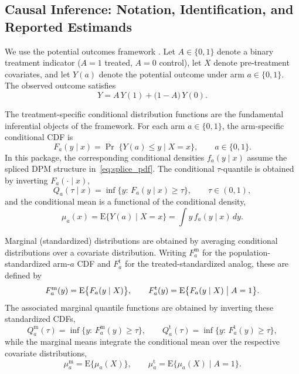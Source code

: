 \documentclass[article]{jss}\usepackage[]{graphicx}\usepackage[]{xcolor}
\begin{document}
\subsection{Causal Inference: Notation, Identification, and Reported Estimands}
\label{subsec:causal}

We use the potential outcomes framework
\citep{Neyman1923,Rubin1974,ImbensRubin2015}. Let $A\in\{0,1\}$ denote a
binary treatment indicator ($A=1$ treated, $A=0$ control), let $X$ denote
pre-treatment covariates, and let $Y(a)$ denote the potential outcome under arm
$a\in\{0,1\}$. The observed outcome satisfies
\begin{equation}
Y = A\,Y(1) + \bigl(1-A\bigr)\,Y(0).
\label{eq:po_observed}
\end{equation}

The treatment-specific conditional distribution functions are the
fundamental inferential objects of the framework. For each arm
$a\in\{0,1\}$, the arm-specific conditional CDF is
\begin{equation}
F_a(y\mid x)=\Pr\;\{Y(a)\le y \mid X=x\},\qquad a\in\{0,1\}.
\label{eq:po_cond_cdf}
\end{equation}
In this package, the corresponding conditional densities $f_a(y\mid x)$
assume the spliced DPM structure in~\eqref{eq:splice_pdf}. The
conditional $\tau$-quantile is obtained by inverting $F_a(\cdot\mid x)$,
\begin{equation}
Q_a(\tau\mid x)=\inf\{y:\,F_a(y\mid x)\ge \tau\},\qquad \tau\in(0,1),
\label{eq:po_cond_quantile}
\end{equation}
and the conditional mean is a functional of the conditional density,
\begin{equation}
\mu_a(x)=\mathrm{E}\{Y(a)\mid X=x\}=\int y\, f_a(y\mid x)\,dy.
\label{eq:po_cond_mean}
\end{equation}

Marginal (standardized) distributions are obtained by averaging
conditional distributions over a covariate distribution. Writing
$F_a^{\mathrm{m}}$ for the population-standardized arm-$a$ CDF and
$F_a^{\mathrm{t}}$ for the treated-standardized analog, these are
defined by
\begin{equation}
F_a^{\mathrm{m}}(y)=\mathrm{E}\bigl\{F_a(y\mid X)\bigr\},
\qquad
F_a^{\mathrm{t}}(y)=\mathrm{E}\bigl\{F_a(y\mid X)\bigm\vert A=1\bigr\}.
\label{eq:marginal_cdf_defs}
\end{equation}
The associated marginal quantile functions are obtained by inverting
these standardized CDFs,
\begin{equation}
Q_a^{\mathrm{m}}(\tau)=\inf\{y:\,F_a^{\mathrm{m}}(y)\ge \tau\},
\qquad
Q_a^{\mathrm{t}}(\tau)=\inf\{y:\,F_a^{\mathrm{t}}(y)\ge \tau\},
\label{eq:marginal_quantile_defs}
\end{equation}
while the marginal means integrate the conditional mean over the
respective covariate distributions,
\begin{equation}
\mu_a^{\mathrm{m}}=\mathrm{E}\bigl\{\mu_a(X)\bigr\},
\qquad
\mu_a^{\mathrm{t}}=\mathrm{E}\bigl\{\mu_a(X)\mid A=1\bigr\}.
\label{eq:marginal_mean_defs}
\end{equation}
\end{document}

